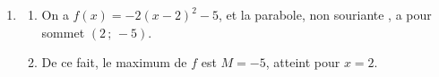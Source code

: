 \documentclass[a4paper,11pt]{article}
\begin{document}
\begin{enumerate}
\begin{enumerate}
\begin{center}
		\end{center}
	\end{enumerate}
	\item 
	\begin{enumerate}
		\item On a $f(x)=-2(x-2)^2-5$, et la parabole, \og non souriante \fg{}, a pour sommet $(2\,;\,-5)$.
		\item De ce fait, le maximum de $f$ est $M=-5$, atteint pour $x=2$.
	\end{enumerate}
\end{enumerate}

\medskip

\end{document}
